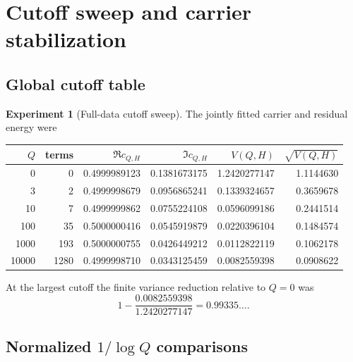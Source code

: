 \documentclass[11pt]{amsart}
\numberwithin{equation}{section}
\theoremstyle{plain}
\theoremstyle{definition}
\newtheorem{experiment}[theorem]{Experiment}
\theoremstyle{remark}
\newcommand{\1}{\mathbf{1}}
\begin{document}
\section{Cutoff sweep and carrier stabilization}
\label{sec:numerical_cutoff_sweep}

\subsection{Global cutoff table}
\label{subsec:numerical_global_cutoff_table}

\begin{experiment}[Full-data cutoff sweep]
\label{exp:full_data_sweep}
The jointly fitted carrier and residual energy were
\begin{center}
\begin{tabular}{rrrrrr}
\toprule
$Q$ & terms & $\Re c_{Q,H}$ & $\Im c_{Q,H}$ & $V(Q,H)$ & $\sqrt{V(Q,H)}$\\
\midrule
0 & 0 & 0.4999989123 & 0.1381673175 & 1.2420277147 & 1.1144630\\
3 & 2 & 0.4999998679 & 0.0956865241 & 0.1339324657 & 0.3659678\\
10 & 7 & 0.4999999862 & 0.0755224108 & 0.0596099186 & 0.2441514\\
100 & 35 & 0.5000000416 & 0.0545919879 & 0.0220396104 & 0.1484574\\
1000 & 193 & 0.5000000755 & 0.0426449212 & 0.0112822119 & 0.1062178\\
10000 & 1280 & 0.4999998710 & 0.0343125459 & 0.0082559398 & 0.0908622\\
\bottomrule
\end{tabular}
\end{center}
At the largest cutoff the finite variance reduction relative to $Q=0$ was
\begin{equation}
1-\frac{0.0082559398}{1.2420277147}
=0.99335\ldots.
\label{eq:numerical_variance_reduction_detailed}
\end{equation}
\end{experiment}

\subsection{Normalized $1/\log Q$ comparisons}
\label{subsec:numerical_normalized_scaling}
\end{document}
